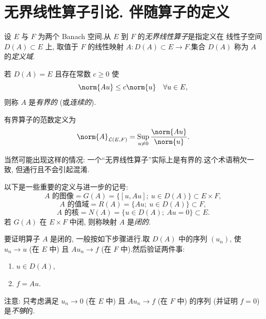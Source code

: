 \section{
无界线性算子引论. 
伴随算子的定义}
\label{sec:2.6}

\begin{definition}
设 $E$ 与 $F$ 为两个 Banach 空间.从 $E$ 到 $F$ 的\emph{无界线性算子}是指定义在
线性子空间 $D(A)\subset E$ 上, 取值于 $F$ 的线性映射 $A:D(A)\subset E\to F$.集合
$D(A)$ 称为 $A$ 的\emph{定义域}.

若 $D(A)=E$ 且存在常数 $c\ge0$ 使
\begin{equation*}
\norm{Au}\le c\norm{u}\quad \forall u\in E,
\end{equation*}
则称 $A$ 是\emph{有界的} (或\emph{连续的}).

有界算子的范数定义为
\begin{equation*}
\norm{A}_{\LL(E,F)}=\operatorname*{Sup}_{u\ne0}\frac{\norm{Au}}{\norm{u}}.
\end{equation*}
\end{definition}

\begin{remark}
\label{rem:2.10}
当然可能出现这样的情况: 一个``无界线性算子''实际上是有界的.这个术语稍欠一致,
但通行且不会引起混淆.
\end{remark}

以下是一些重要的定义与进一步的记号:
\begin{equation*}
\boxed{\text{$A$ 的图像}=G(A)=\{[u,Au];\ u\in D(A)\}\subset E\times F,}
\end{equation*}
\begin{equation*}
\boxed{\text{$A$ 的值域}=R(A)=\{Au;\ u\in D(A)\}\subset F,}
\end{equation*}
\begin{equation*}
\boxed{\text{$A$ 的核}=N(A)=\{u\in D(A);\ Au=0\}\subset E.}
\end{equation*}
若 $G(A)$ 在 $E\times F$ 中闭, 则称映射 $A$ 是\emph{闭的}.

\begin{keyremark}
\label{rem:2.11}
要证明算子 $A$ 是闭的, 一般按如下步骤进行.取 $D(A)$ 中的序列 $(u_n)$, 使
$u_n\to u$ (在 $E$ 中) 且 $Au_n\to f$ (在 $F$ 中).然后验证两件事:
\begin{enumerate}[label=(\alph*), leftmargin=2.0em, itemsep=0.15em]
	\item $u\in D(A)$,
	\item $f=Au$.
\end{enumerate}
注意: 只考虑满足 $u_n\to0$ (在 $E$ 中) 且 $Au_n\to f$ (在 $F$ 中) 的序列
(并证明 $f=0$) 是\emph{不够}的.
\end{keyremark}

